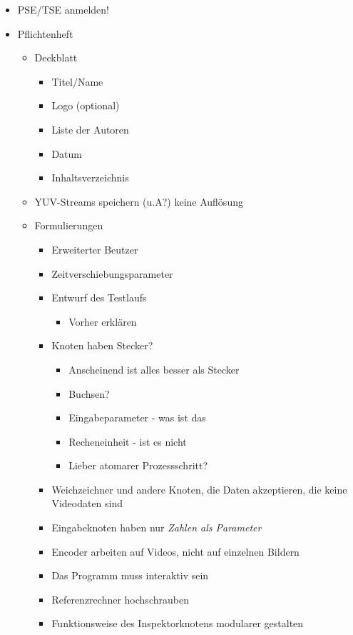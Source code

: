 \documentclass[a4paper]{article}
\begin{document}
\begin{itemize}
  \item PSE/TSE anmelden!
  \item Pflichtenheft
  \begin{itemize}
    \item Deckblatt
    \begin{itemize}
      \item Titel/Name
      \item Logo (optional)
      \item Liste der Autoren
      \item Datum
      \item Inhaltsverzeichnis
    \end{itemize}
    \item YUV-Streams speichern (u.A?) keine Auflösung
    \item Formulierungen
	  \begin{itemize}
	    \item \glqq Erweiterter Beutzer\grqq
	    \item \glqq Zeitverschiebungsparameter\grqq
	    \item \glqq Entwurf des Testlaufs\grqq
	    \begin{itemize}
	      \item Vorher erklären
	    \end{itemize}
	    \item Knoten haben Stecker?
	    \begin{itemize}
	      \item Anscheinend ist alles besser als Stecker
	      \item Buchsen?
	      \item Eingabeparameter - was ist das
	      \item Recheneinheit - ist es nicht
	      \item Lieber \glqq atomarer Prozessschritt\grqq?
	    \end{itemize}
	    \item Weichzeichner und andere Knoten, die Daten akzeptieren, die keine Videodaten sind
	    \item Eingabeknoten haben nur \emph{Zahlen als Parameter}
	    \item Encoder arbeiten auf Videos, nicht auf einzelnen Bildern
	    \item {\LARGE Das Programm muss interaktiv sein}
	    \item Referenzrechner hochschrauben
	    \item Funktionsweise des Inspektorknotens modularer gestalten

\end{itemize}
\end{itemize}
\end{itemize}
\end{document}
